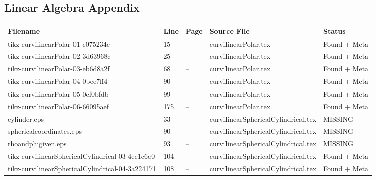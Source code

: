 \documentclass[11pt]{article}
\begin{document}
\subsection{Linear Algebra Appendix}



\begin{longtable}{|p{3.5cm}|p{1.5cm}|p{1cm}|p{4cm}|p{2cm}|}
\hline
\textbf{Filename} & \textbf{Line} & \textbf{Page} & \textbf{Source File} & \textbf{Status} \\
\hline
\endhead

tikz-curvilinearPolar-01-c075234c & 15 & -- & curvilinearPolar.tex & \textcolor{found}{Found + Meta} \\
\hline

tikz-curvilinearPolar-02-3d63968c & 25 & -- & curvilinearPolar.tex & \textcolor{found}{Found + Meta} \\
\hline

tikz-curvilinearPolar-03-eb6d8a2f & 68 & -- & curvilinearPolar.tex & \textcolor{found}{Found + Meta} \\
\hline

tikz-curvilinearPolar-04-0bee7ff4 & 90 & -- & curvilinearPolar.tex & \textcolor{found}{Found + Meta} \\
\hline

tikz-curvilinearPolar-05-0ef0bfdb & 99 & -- & curvilinearPolar.tex & \textcolor{found}{Found + Meta} \\
\hline

tikz-curvilinearPolar-06-66095aef & 175 & -- & curvilinearPolar.tex & \textcolor{found}{Found + Meta} \\
\hline

cylinder.eps & 33 & -- & curvilinearSphericalCylindrical.tex & \textcolor{missing}{MISSING} \\
\hline

sphericalcoordinates.eps & 90 & -- & curvilinearSphericalCylindrical.tex & \textcolor{missing}{MISSING} \\
\hline

rhoandphigiven.eps & 93 & -- & curvilinearSphericalCylindrical.tex & \textcolor{missing}{MISSING} \\
\hline

tikz-curvilinearSphericalCylindrical-03-4ec1c6e0 & 104 & -- & curvilinearSphericalCylindrical.tex & \textcolor{found}{Found + Meta} \\
\hline

tikz-curvilinearSphericalCylindrical-04-3a224171 & 108 & -- & curvilinearSphericalCylindrical.tex & \textcolor{found}{Found + Meta} \\
\hline


\end{longtable}
\end{document}
